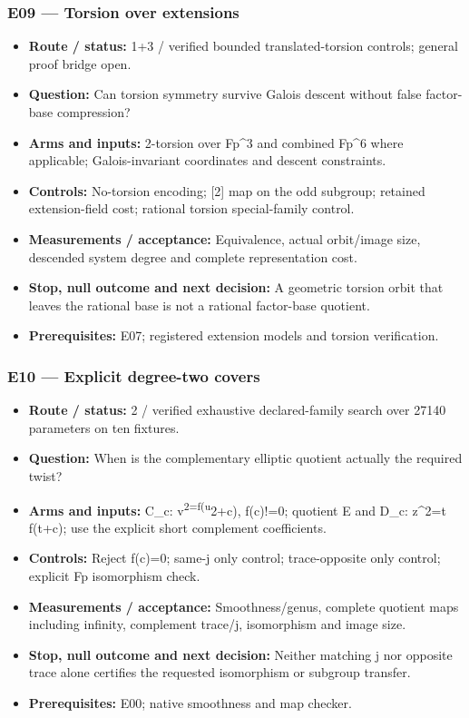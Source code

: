 \documentclass[
  10pt,
]{article}
\providecommand{\tightlist}{%
  \setlength{\itemsep}{0pt}\setlength{\parskip}{0pt}}
\begin{document}
\subsubsection{E09 --- Torsion over
extensions}\label{e09-torsion-over-extensions}

\begin{itemize}
\tightlist
\item
  \textbf{Route / status:} 1+3 / verified bounded translated-torsion
  controls; general proof bridge open.
\item
  \textbf{Question:} Can torsion symmetry survive Galois descent without
  false factor-base compression?
\item
  \textbf{Arms and inputs:} 2-torsion over Fp\^{}3 and combined Fp\^{}6
  where applicable; Galois-invariant coordinates and descent
  constraints.
\item
  \textbf{Controls:} No-torsion encoding; {[}2{]} map on the odd
  subgroup; retained extension-field cost; rational torsion
  special-family control.
\item
  \textbf{Measurements / acceptance:} Equivalence, actual orbit/image
  size, descended system degree and complete representation cost.
\item
  \textbf{Stop, null outcome and next decision:} A geometric torsion
  orbit that leaves the rational base is not a rational factor-base
  quotient.
\item
  \textbf{Prerequisites:} E07; registered extension models and torsion
  verification.
\end{itemize}

\subsubsection{E10 --- Explicit degree-two
covers}\label{e10-explicit-degree-two-covers}

\begin{itemize}
\tightlist
\item
  \textbf{Route / status:} 2 / verified exhaustive declared-family
  search over 27140 parameters on ten fixtures.
\item
  \textbf{Question:} When is the complementary elliptic quotient
  actually the required twist?
\item
  \textbf{Arms and inputs:} C\_c: v\textsuperscript{2=f(u}2+c), f(c)!=0;
  quotient E and D\_c: z\^{}2=t f(t+c); use the explicit short
  complement coefficients.
\item
  \textbf{Controls:} Reject f(c)=0; same-j only control; trace-opposite
  only control; explicit Fp isomorphism check.
\item
  \textbf{Measurements / acceptance:} Smoothness/genus, complete
  quotient maps including infinity, complement trace/j, isomorphism and
  image size.
\item
  \textbf{Stop, null outcome and next decision:} Neither matching j nor
  opposite trace alone certifies the requested isomorphism or subgroup
  transfer.
\item
  \textbf{Prerequisites:} E00; native smoothness and map checker.
\end{itemize}
\end{document}
